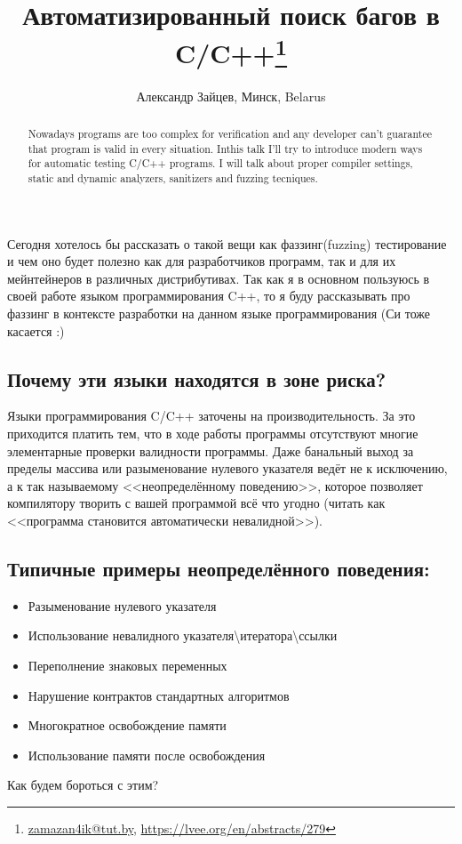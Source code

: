 \documentclass[10pt, a5paper]{article}
\begin{document}
\title{Автоматизированный поиск багов в C/C++\footnote{\url{zamazan4ik@tut.by}, \url{https://lvee.org/en/abstracts/279}}}
\author{Александр Зайцев, Минск, Belarus}
\maketitle
\begin{abstract}
Nowadays programs are too complex for verification and any developer can't guarantee that program is valid in every situation. Inthis talk I'll try to introduce modern ways for automatic testing C/C++ programs. I will talk about proper compiler settings, static and dynamic analyzers, sanitizers and fuzzing tecniques.
\end{abstract}

Сегодня хотелось бы рассказать о такой вещи как фаззинг\linebreak (fuzzing) тестирование и чем оно будет полезно как для разработчиков программ, так и для их мейнтейнеров в различных дистрибутивах. Так как я в основном пользуюсь в своей работе языком программирования C++, то я буду рассказывать про фаззинг в контексте разработки на данном языке программирования (Си тоже касается :)

\subsection*{Почему эти языки находятся в зоне риска?}

Языки программирования C/C++ заточены на производительность. За это приходится платить тем, что в ходе работы программы отсутствуют многие элементарные проверки валидности программы. Даже банальный выход за пределы массива или разыменование нулевого указателя ведёт не к исключению, а к так называемому <<неопределённому поведению>>, которое позволяет компилятору творить с вашей программой всё что угодно (читать как <<программа становится автоматически невалидной>>).

\subsection*{Типичные примеры неопределённого поведения:}
\begin{itemize}
\item Разыменование нулевого указателя
\item Использование невалидного указателя\textbackslash{}итератора\textbackslash{}ссылки
\item Переполнение знаковых переменных
\item Нарушение контрактов стандартных алгоритмов
\item Многократное освобождение памяти
\item Использование памяти после освобождения
\end{itemize}
Как будем бороться с этим?
\end{document}
